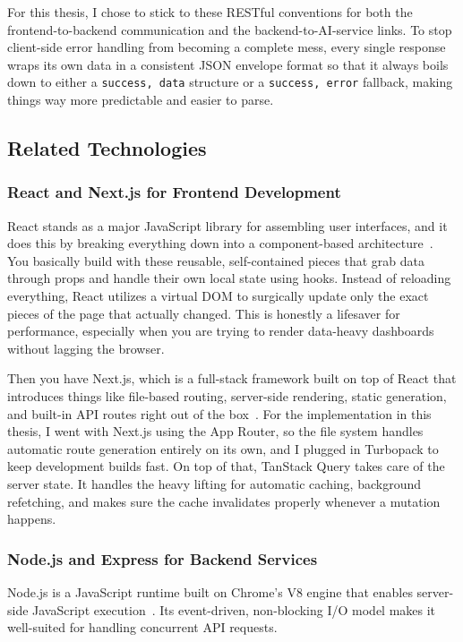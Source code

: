 \documentclass[12pt,a4paper]{article}
\begin{document}
For this thesis, I chose to stick to these RESTful conventions for both the frontend-to-backend communication and the backend-to-AI-service links. To stop client-side error handling from becoming a complete mess, every single response wraps its own data in a consistent JSON envelope format so that it always boils down to either a \texttt{{success, data}} structure or a \texttt{{success, error}} fallback, making things way more predictable and easier to parse.

\subsection{Related Technologies}

\subsubsection{React and Next.js for Frontend Development}

React stands as a major JavaScript library for assembling user interfaces, and it does this by breaking everything down into a component-based architecture~\cite{react2024}. You basically build with these reusable, self-contained pieces that grab data through props and handle their own local state using hooks. Instead of reloading everything, React utilizes a virtual DOM to surgically update only the exact pieces of the page that actually changed. This is honestly a lifesaver for performance, especially when you are trying to render data-heavy dashboards without lagging the browser.

Then you have Next.js, which is a full-stack framework built on top of React that introduces things like file-based routing, server-side rendering, static generation, and built-in API routes right out of the box~\cite{nextjs2024}. For the implementation in this thesis, I went with Next.js using the App Router, so the file system handles automatic route generation entirely on its own, and I plugged in Turbopack to keep development builds fast. On top of that, TanStack Query takes care of the server state. It handles the heavy lifting for automatic caching, background refetching, and makes sure the cache invalidates properly whenever a mutation happens.

\subsubsection{Node.js and Express for Backend Services}

Node.js is a JavaScript runtime built on Chrome's V8 engine that enables
server-side JavaScript execution~\cite{nodejs2024}. Its event-driven,
non-blocking I/O model makes it well-suited for handling concurrent API
requests.
\end{document}
